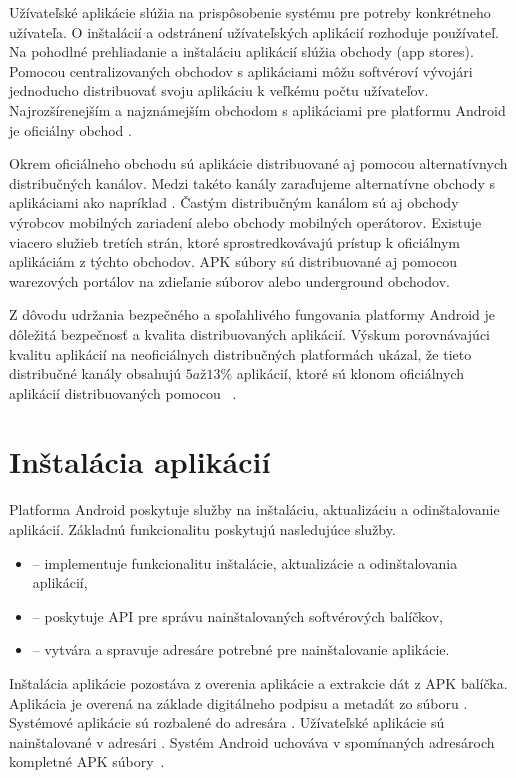 Užívateľské aplikácie slúžia na prispôsobenie systému pre potreby konkrétneho užívateľa. O inštalácií a odstránení užívateľských aplikácií rozhoduje používateľ. Na pohodlné prehliadanie a inštaláciu aplikácií slúžia obchody (app stores). Pomocou centralizovaných obchodov s aplikáciami môžu softvéroví vývojári jednoducho distribuovať svoju aplikáciu k veľkému počtu užívateľov.  Najrozšírenejším a najznámejším obchodom s aplikáciami pre platformu Android je oficiálny obchod . 

Okrem oficiálneho obchodu sú aplikácie distribuované aj pomocou alternatívnych distribučných kanálov. Medzi takéto kanály zaraďujeme alternatívne obchody s aplikáciami ako napríklad . Častým distribučným kanálom sú aj obchody výrobcov mobilných zariadení alebo obchody mobilných operátorov. Existuje viacero služieb tretích strán, ktoré sprostredkovávajú prístup k oficiálnym aplikáciám z týchto obchodov. APK súbory sú distribuované aj pomocou warezových portálov na zdieľanie súborov alebo underground obchodov. 

Z dôvodu udržania bezpečného a spoľahlivého fungovania platformy Android je dôležitá bezpečnosť a kvalita distribuovaných aplikácií. Výskum porovnávajúci kvalitu aplikácií na neoficiálnych distribučných platformách ukázal, že tieto distribučné kanály obsahujú $5 až 13\%$ aplikácií, ktoré sú klonom oficiálnych aplikácií distribuovaných pomocou  ~\cite{Zhou2012}.

\section{Inštalácia aplikácií}

Platforma Android poskytuje služby na inštaláciu, aktualizáciu a odinštalovanie aplikácií. \newline
Základnú funkcionalitu poskytujú nasledujúce služby.
\begin{itemize}
	\item {} -- implementuje funkcionalitu inštalácie, aktualizácie a odinštalovania aplikácií,
	\item {} -- poskytuje API pre správu nainštalovaných softvérových balíčkov,
	\item {} -- vytvára a spravuje adresáre potrebné pre nainštalovanie aplikácie.
\end{itemize}
Inštalácia aplikácie pozostáva z overenia aplikácie a extrakcie dát z APK balíčka. Aplikácia je overená na základe digitálneho podpisu a metadát zo súboru . Systémové aplikácie sú rozbalené do adresára . Užívateľské aplikácie sú nainštalované v adresári . Systém Android uchováva v spomínaných adresároch kompletné APK súbory~\cite{AndroidDeveloper}.

